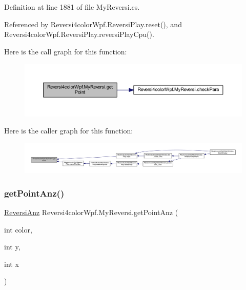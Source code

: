 Definition at line 1881 of file My\+Reversi.\+cs.



Referenced by Reversi4color\+Wpf.\+Reversi\+Play.\+reset(), and Reversi4color\+Wpf.\+Reversi\+Play.\+reversi\+Play\+Cpu().

Here is the call graph for this function\+:
\nopagebreak
\begin{figure}[H]
\begin{center}
\leavevmode
\includegraphics[width=350pt]{class_reversi4color_wpf_1_1_my_reversi_a13dc626307cc782c31fa88bf41797de0_cgraph}
\end{center}
\end{figure}
Here is the caller graph for this function\+:
\nopagebreak
\begin{figure}[H]
\begin{center}
\leavevmode
\includegraphics[width=350pt]{class_reversi4color_wpf_1_1_my_reversi_a13dc626307cc782c31fa88bf41797de0_icgraph}
\end{center}
\end{figure}
\mbox{\label{class_reversi4color_wpf_1_1_my_reversi_a9b2fa842b47dab7f22cdfd888700c92c}} 
\subsubsection{\texorpdfstring{get\+Point\+Anz()}{getPointAnz()}}
{\footnotesize\ttfamily \hyperlink{class_reversi4color_wpf_1_1_reversi_anz}{Reversi\+Anz} Reversi4color\+Wpf.\+My\+Reversi.\+get\+Point\+Anz (\begin{DoxyParamCaption}\item[{int}]{color,  }\item[{int}]{y,  }\item[{int}]{x }\end{DoxyParamCaption})}



